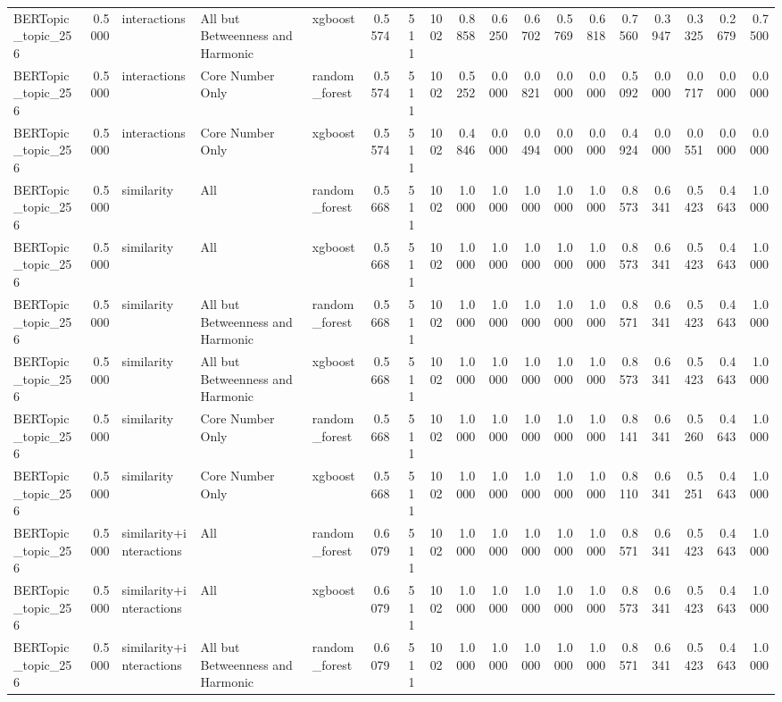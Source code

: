 \begin{tabular}{lrlllrrrrrrrrrrrrr}
BERTopic_topic_256 & 0.5000 & interactions & All but Betweenness and Harmonic & xgboost & 0.5574 & 511 & 1002 & 0.8858 & 0.6250 & 0.6702 & 0.5769 & 0.6818 & 0.7560 & 0.3947 & 0.3325 & 0.2679 & 0.7500 \\
BERTopic_topic_256 & 0.5000 & interactions & Core Number Only & random_forest & 0.5574 & 511 & 1002 & 0.5252 & 0.0000 & 0.0821 & 0.0000 & 0.0000 & 0.5092 & 0.0000 & 0.0717 & 0.0000 & 0.0000 \\
BERTopic_topic_256 & 0.5000 & interactions & Core Number Only & xgboost & 0.5574 & 511 & 1002 & 0.4846 & 0.0000 & 0.0494 & 0.0000 & 0.0000 & 0.4924 & 0.0000 & 0.0551 & 0.0000 & 0.0000 \\
BERTopic_topic_256 & 0.5000 & similarity & All & random_forest & 0.5668 & 511 & 1002 & 1.0000 & 1.0000 & 1.0000 & 1.0000 & 1.0000 & 0.8573 & 0.6341 & 0.5423 & 0.4643 & 1.0000 \\
BERTopic_topic_256 & 0.5000 & similarity & All & xgboost & 0.5668 & 511 & 1002 & 1.0000 & 1.0000 & 1.0000 & 1.0000 & 1.0000 & 0.8573 & 0.6341 & 0.5423 & 0.4643 & 1.0000 \\
BERTopic_topic_256 & 0.5000 & similarity & All but Betweenness and Harmonic & random_forest & 0.5668 & 511 & 1002 & 1.0000 & 1.0000 & 1.0000 & 1.0000 & 1.0000 & 0.8571 & 0.6341 & 0.5423 & 0.4643 & 1.0000 \\
BERTopic_topic_256 & 0.5000 & similarity & All but Betweenness and Harmonic & xgboost & 0.5668 & 511 & 1002 & 1.0000 & 1.0000 & 1.0000 & 1.0000 & 1.0000 & 0.8573 & 0.6341 & 0.5423 & 0.4643 & 1.0000 \\
BERTopic_topic_256 & 0.5000 & similarity & Core Number Only & random_forest & 0.5668 & 511 & 1002 & 1.0000 & 1.0000 & 1.0000 & 1.0000 & 1.0000 & 0.8141 & 0.6341 & 0.5260 & 0.4643 & 1.0000 \\
BERTopic_topic_256 & 0.5000 & similarity & Core Number Only & xgboost & 0.5668 & 511 & 1002 & 1.0000 & 1.0000 & 1.0000 & 1.0000 & 1.0000 & 0.8110 & 0.6341 & 0.5251 & 0.4643 & 1.0000 \\
BERTopic_topic_256 & 0.5000 & similarity+interactions & All & random_forest & 0.6079 & 511 & 1002 & 1.0000 & 1.0000 & 1.0000 & 1.0000 & 1.0000 & 0.8571 & 0.6341 & 0.5423 & 0.4643 & 1.0000 \\
BERTopic_topic_256 & 0.5000 & similarity+interactions & All & xgboost & 0.6079 & 511 & 1002 & 1.0000 & 1.0000 & 1.0000 & 1.0000 & 1.0000 & 0.8573 & 0.6341 & 0.5423 & 0.4643 & 1.0000 \\
BERTopic_topic_256 & 0.5000 & similarity+interactions & All but Betweenness and Harmonic & random_forest & 0.6079 & 511 & 1002 & 1.0000 & 1.0000 & 1.0000 & 1.0000 & 1.0000 & 0.8571 & 0.6341 & 0.5423 & 0.4643 & 1.0000 \\

\end{tabular}
